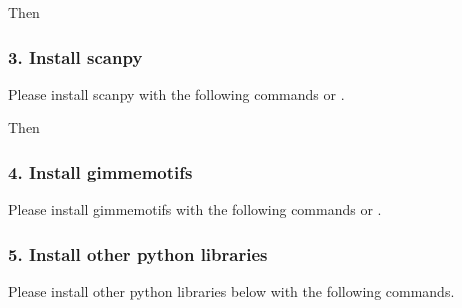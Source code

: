 \documentclass[letterpaper,10pt,english]{sphinxmanual}
\begin{document}
Then

%
\begin{sphinxVerbatim}[commandchars=\\\{\}]
  
\end{sphinxVerbatim}


\subsubsection{3. Install scanpy}
\label{\detokenize{installation/index:install-scanpy}}
Please install scanpy with the following commands or  .

%
\begin{sphinxVerbatim}[commandchars=\\\{\}]
        
\end{sphinxVerbatim}

Then

%
\begin{sphinxVerbatim}[commandchars=\\\{\}]
  
\end{sphinxVerbatim}


\subsubsection{4. Install gimmemotifs}
\label{\detokenize{installation/index:install-gimmemotifs}}
Please install gimmemotifs with the following commands or  .

%
\begin{sphinxVerbatim}[commandchars=\\\{\}]
   
\end{sphinxVerbatim}


\subsubsection{5. Install other python libraries}
\label{\detokenize{installation/index:install-other-python-libraries}}
Please install other python libraries below with the following commands.
\end{document}
